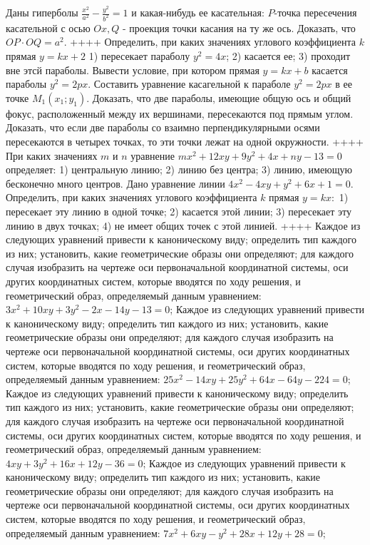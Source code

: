 Даны гиперболы $\frac{x^2}{a^2}-\frac{y^2}{b^2}=1$ и какая-нибудь ее касательная: $P$-точка пересечения касательной с осью $O x, Q$ - проекция точки касания на ту же ось. Доказать, что $O P \cdot O Q=a^2$.
++++
Определить, при каких значениях углового коэффициента $k$ прямая $y=k x+2$ 1) пересекает параболу $y^2=4 x$; 2) касается ее; 3) проходит вне этсй параболы.
Вывести условие, при котором прямая $y=k x+b$ касается параболы $y^2=2 p x$.
Составить уравнение касагельной к параболе $y^2=2 p x$ в ее точке $M_1\left(x_1 ; y_1\right)$.
Доказать, что две параболы, имеющие общую ось и общий фокус, расположенный между их вершинами, пересекаются под прямым углом.
Доказать, что если две параболы со взаимно перпендикулярными осями пересекаются в четырех точках, то эти точки лежат на одной окружности.
++++
При каких значениях $m$ и $n$ уравнение $m x^2+12 x y+9 y^2+4 x+n y-13=0$ определяет: 1) центральную линию; 2) линию без центра; 3) линию, имеющую бесконечно много центров.
Дано уравнение линии $4 x^2-4 x y+y^2+6 x+1=0$. Определить, при каких значениях углового коэффициента $k$ прямая $y=k x:$ 1) пересекает эту линию в одной точке; 2) касается этой линии; 3) пересекает эту линию в двух точках; 4) не имеет общих точек с этой линией.
++++
Каждое из следующих уравнений привести к каноническому виду; определить тип каждого из них; установить, какие геометрические образы они определяют; для каждого случая изобразить на чертеже оси первоначальной координатной системы, оси других координатных систем, которые вводятся по ходу решения, и геометрический образ, определяемый данным уравнением: $3 x^2+10 x y+3 y^2-2 x-14 y-13=0$;
Каждое из следующих уравнений привести к каноническому виду; определить тип каждого из них; установить, какие геометрические образы они определяют; для каждого случая изобразить на чертеже оси первоначальной координатной системы, оси других координатных систем, которые вводятся по ходу решения, и геометрический образ, определяемый данным уравнением: $25 x^2-14 x y+25 y^2+64 x-64 y-224=0$;
Каждое из следующих уравнений привести к каноническому виду; определить тип каждого из них; установить, какие геометрические образы они определяют; для каждого случая изобразить на чертеже оси первоначальной координатной системы, оси других координатных систем, которые вводятся по ходу решения, и геометрический образ, определяемый данным уравнением: $4 x y+3 y^2+16 x+12 y-36=0$;
Каждое из следующих уравнений привести к каноническому виду; определить тип каждого из них; установить, какие геометрические образы они определяют; для каждого случая изобразить на чертеже оси первоначальной координатной системы, оси других координатных систем, которые вводятся по ходу решения, и геометрический образ, определяемый данным уравнением: $7 x^2+6 x y-y^2+28 x+12 y+28=0$;
